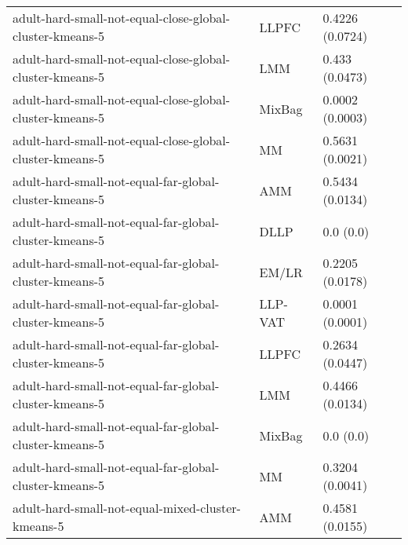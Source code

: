 \begin{longtable}{lll}
                                                     adult-hard-small-not-equal-close-global-cluster-kmeans-5 &     LLPFC &                           0.4226 (0.0724) \\
                                                     adult-hard-small-not-equal-close-global-cluster-kmeans-5 &       LMM &                            0.433 (0.0473) \\
                                                     adult-hard-small-not-equal-close-global-cluster-kmeans-5 &    MixBag &                           0.0002 (0.0003) \\
                                                     adult-hard-small-not-equal-close-global-cluster-kmeans-5 &        MM &                           0.5631 (0.0021) \\
                                                       adult-hard-small-not-equal-far-global-cluster-kmeans-5 &       AMM &                           0.5434 (0.0134) \\
                                                       adult-hard-small-not-equal-far-global-cluster-kmeans-5 &      DLLP &                                 0.0 (0.0) \\
                                                       adult-hard-small-not-equal-far-global-cluster-kmeans-5 &     EM/LR &                           0.2205 (0.0178) \\
                                                       adult-hard-small-not-equal-far-global-cluster-kmeans-5 &   LLP-VAT &                           0.0001 (0.0001) \\
                                                       adult-hard-small-not-equal-far-global-cluster-kmeans-5 &     LLPFC &                           0.2634 (0.0447) \\
                                                       adult-hard-small-not-equal-far-global-cluster-kmeans-5 &       LMM &                           0.4466 (0.0134) \\
                                                       adult-hard-small-not-equal-far-global-cluster-kmeans-5 &    MixBag &                                 0.0 (0.0) \\
                                                       adult-hard-small-not-equal-far-global-cluster-kmeans-5 &        MM &                           0.3204 (0.0041) \\
                                                            adult-hard-small-not-equal-mixed-cluster-kmeans-5 &       AMM &                           0.4581 (0.0155) \\

\end{longtable}
